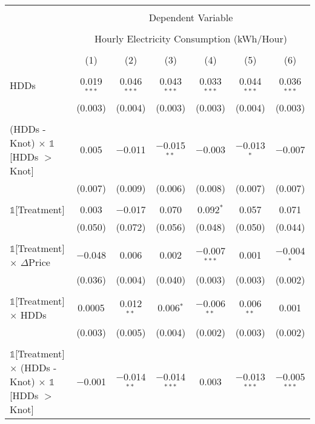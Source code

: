 
\begin{table}[!htbp] \centering 
  \label{Table:Breakdown-of-Average-Treatement-Effects_As-a-Function-of-Rate-Changes_For-Different-Intervals} 
\scriptsize
\begin{longtable}{@{\extracolsep{15pt}}lcccccc} 
\\[-1.8ex]\hline 
\hline \\[-1.8ex] 
 & \multicolumn{6}{c}{Dependent Variable} \\ 
\cline{2-7} 
\\[-1.8ex] & \multicolumn{6}{c}{Hourly Electricity Consumption  (kWh/Hour)} \\ 
\\[-1.8ex] & (1) & (2) & (3) & (4) & (5) & (6)\\ 
\hline \\[-1.8ex] \endhead
 HDDs & 0.019$^{***}$ & 0.046$^{***}$ & 0.043$^{***}$ & 0.033$^{***}$ & 0.044$^{***}$ & 0.036$^{***}$ \\ 
  & (0.003) & (0.004) & (0.003) & (0.003) & (0.004) & (0.003) \\ 
  & & & & & & \\ 
 (HDDs - Knot) $\times$ $\mathbb{1}$[HDDs $>$ Knot] & 0.005 & $-$0.011 & $-$0.015$^{**}$ & $-$0.003 & $-$0.013$^{*}$ & $-$0.007 \\ 
  & (0.007) & (0.009) & (0.006) & (0.008) & (0.007) & (0.007) \\ 
  & & & & & & \\ 
 $\mathbb{1}$[Treatment] & 0.003 & $-$0.017 & 0.070 & 0.092$^{*}$ & 0.057 & 0.071 \\ 
  & (0.050) & (0.072) & (0.056) & (0.048) & (0.050) & (0.044) \\ 
  & & & & & & \\ 
 $\mathbb{1}$[Treatment] $\times$ $\Delta$Price & $-$0.048 & 0.006 & 0.002 & $-$0.007$^{***}$ & 0.001 & $-$0.004$^{*}$ \\ 
  & (0.036) & (0.004) & (0.040) & (0.003) & (0.003) & (0.002) \\ 
  & & & & & & \\ 
 $\mathbb{1}$[Treatment] $\times$ HDDs & 0.0005 & 0.012$^{**}$ & 0.006$^{*}$ & $-$0.006$^{**}$ & 0.006$^{**}$ & 0.001 \\ 
  & (0.003) & (0.005) & (0.004) & (0.002) & (0.003) & (0.002) \\ 
  & & & & & & \\ 
 $\mathbb{1}$[Treatment] $\times$ (HDDs - Knot) $\times$ $\mathbb{1}$[HDDs $>$ Knot] & $-$0.001 & $-$0.014$^{**}$ & $-$0.014$^{***}$ & 0.003 & $-$0.013$^{***}$ & $-$0.005$^{***}$ \\ 

\end{longtable}
\end{table}
